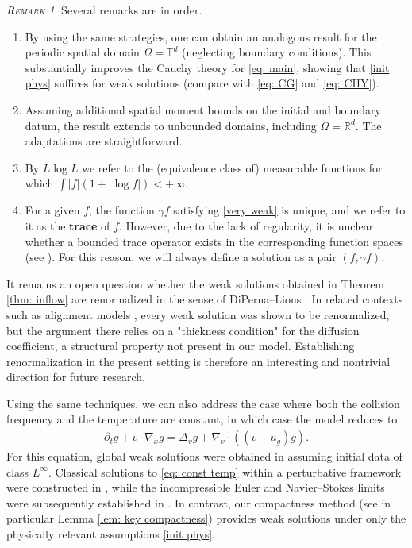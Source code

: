 \documentclass[10pt, reqno]{amsart}
\theoremstyle{plain}
\theoremstyle{definition}
\theoremstyle{remark}
\newtheorem{remark}[theorem]{\normalfont \scshape Remark}
\numberwithin{equation}{section}
\newcommand{\p}{\partial}
\newcommand{\R}{\mathbb{R}}
\newcommand{\T}{\mathbb{T}}
\begin{document}
\begin{remark}
Several remarks are in order.
\begin{enumerate}
    \item By using the same strategies, one can obtain an analogous result for the periodic spatial domain $\Omega = \T^d$ (neglecting boundary conditions). This substantially improves the Cauchy theory for \eqref{eq: main}, showing that \eqref{init phys} suffices for weak solutions (compare with \eqref{eq: CG} and \eqref{eq: CHY}).
    \item Assuming additional spatial moment bounds on the initial and boundary datum, the result extends to unbounded domains, including $\Omega = \R^d$. The adaptations are straightforward.
    \item By $L\log L$ we refer to the (equivalence class of) measurable functions for which $\int |f|(1 + |\log f|) < +\infty.$
    \item For a given $f$, the function $\gamma f$ satisfying \eqref{very weak} is unique, and we refer to it as the \textbf{trace} of $f$. However, due to the lack of regularity, it is unclear whether a bounded trace operator exists in the corresponding function spaces (see \cite[Section 1.2.2]{Zhu24}). For this reason, we will always define a solution as a pair $(f,\gamma f)$.
\end{enumerate}
\end{remark}

It remains an open question whether the weak solutions obtained in Theorem \ref{thm: inflow} are renormalized in the sense of DiPerna--Lions \cite{DipernaLionsODE1989}. In related contexts such as alignment models \cite{shvydkoy2025}, every weak solution was shown to be renormalized, but the argument there relies on a "thickness condition" for the diffusion coefficient, a structural property not present in our model. Establishing renormalization in the present setting is therefore an interesting and nontrivial direction for future research. 

Using the same techniques, we can also address the case where both the collision frequency and the temperature are constant, in which case the model reduces to
\begin{align}\label{eq: const temp}
    \p_t g + v\cdot \nabla_x g = \Delta_v g + \nabla_v\cdot((v-u_g)g).
\end{align}
For this equation, global weak solutions were obtained in \cite{KMT2015} assuming initial data of class $L^\infty$. Classical solutions to \eqref{eq: const temp} within a perturbative framework were constructed in \cite{Choi16}, while the incompressible Euler and Navier--Stokes limits were subsequently established in \cite{CJ24, CJ26}. In contrast, our compactness method (see in particular Lemma \ref{lem: key compactness}) provides weak solutions under only the physically relevant assumptions \eqref{init phys}.
 
\end{document}
